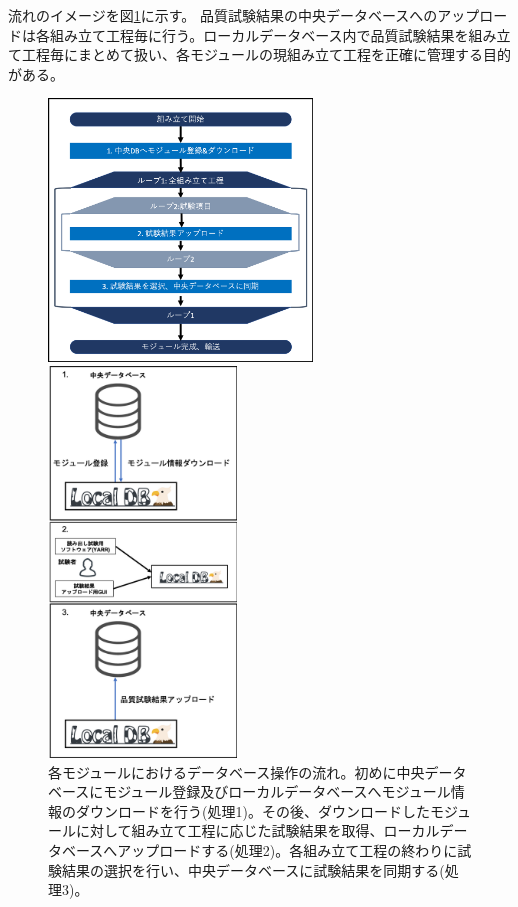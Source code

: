 流れのイメージを図\ref{dbsystem_flow}に示す。
品質試験結果の中央データベースへのアップロードは各組み立て工程毎に行う。ローカルデータベース内で品質試験結果を組み立て工程毎にまとめて扱い、各モジュールの現組み立て工程を正確に管理する目的がある。
\begin{figure}[bpt]\centering
  \begin{minipage}{0.5\hsize}
    \includegraphics[width=7cm]{./dbsystem_flowchart.png}
  \end{minipage}
  \begin{minipage}{0.4\hsize}
    \includegraphics[width=5cm]{./dbsystem_flow_image.png}
  \end{minipage}
\caption[各モジュールにおけるデータベース操作の流れ]{各モジュールにおけるデータベース操作の流れ。初めに中央データベースにモジュール登録及びローカルデータベースへモジュール情報のダウンロードを行う(処理1)。その後、ダウンロードしたモジュールに対して組み立て工程に応じた試験結果を取得、ローカルデータベースへアップロードする(処理2)。各組み立て工程の終わりに試験結果の選択を行い、中央データベースに試験結果を同期する(処理3)。}
\label{dbsystem_flow}
\end{figure}

